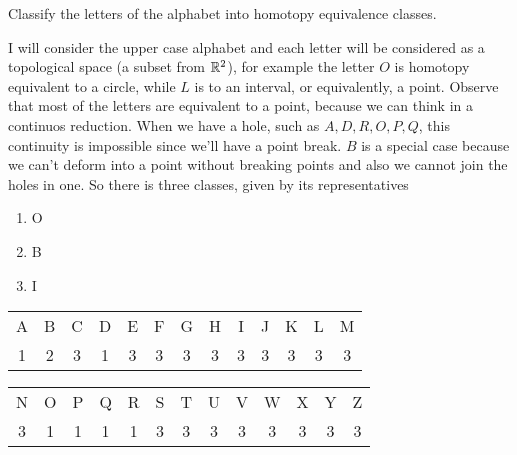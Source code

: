 \noindent\linia

\begin{exercise}
    Classify the letters of the alphabet into homotopy equivalence classes.
\end{exercise}

I will consider the upper case alphabet and each letter will be considered as
a topological space (a subset from $\mathbb{R}^2$), for example the letter $O$ is
homotopy equivalent to a circle, while $L$ is to an interval, or equivalently,
a point. Observe that most of the letters are equivalent to a point, because
we can think in a continuos reduction. When we have a hole, such as $A, D, R, O,
P, Q$, this continuity is impossible since we'll have a point break. $B$ is a
special case because we can't deform into a point without breaking points and
also we cannot join the holes in one. So there is three classes, given by its
representatives

\begin{enumerate}
    \item O
    \item B
    \item I
\end{enumerate}

\begin{center}
    \begin{tabular}{c c c c c c c c c c c c c}
     A & B & C & D & E & F & G & H & I & J & K & L & M   \\ 
     1 & 2 & 3 & 1 & 3 & 3 & 3 & 3 & 3 & 3 & 3 & 3 & 3 
    \end{tabular}
    \end{center}

\begin{center}
    \begin{tabular}{c c c c c c c c c c c c c}
     N & O & P & Q & R & S & T & U & V & W & X & Y & Z  \\ 
     3 & 1 & 1 & 1 & 1 & 3 & 3 & 3 & 3 & 3 & 3 & 3 & 3     
    \end{tabular}
    \end{center}
